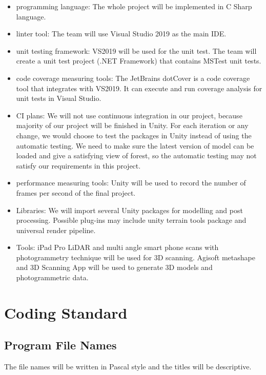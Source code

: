 \documentclass{article}
\begin{document}
\begin{itemize}
\item programming language: The whole project will be implemented in C Sharp language.
\item linter tool: The team will use Visual Studio 2019 as the main IDE.
\item unit testing framework: VS2019 will be used for the unit test. The team will create a unit test project (.NET Framework) that contains MSTest unit tests.
\item code coverage measuring tools: The JetBrains dotCover is a code coverage tool that integrates with VS2019. It can execute and run coverage analysis for unit tests in Visual Studio.
\item CI plans: We will not use continuous integration in our project, because majority of our project will be finished in Unity. For each iteration or any change, we would choose to test the packages in Unity instead of using the automatic testing. We need to make sure the latest version of model can be loaded and give a satisfying view of forest, so the automatic testing may not satisfy our requirements in this project.
\item performance measuring tools: Unity will be used to record the number of frames per second of the final project. 
\item Libraries: We will import several Unity packages for modelling and post processing. Possible plug-ins may include unity terrain tools package and universal render pipeline.
\item Tools: iPad Pro LiDAR and multi angle smart phone scans with photogrammetry technique will be used for 3D scanning. Agisoft metashape and 3D Scanning App will be used to generate 3D models and photogrammetric data.
\end{itemize}

\section{Coding Standard}
\subsection{Program File Names}
The file names will be written in Pascal style and the titles will be descriptive.
\end{document}

